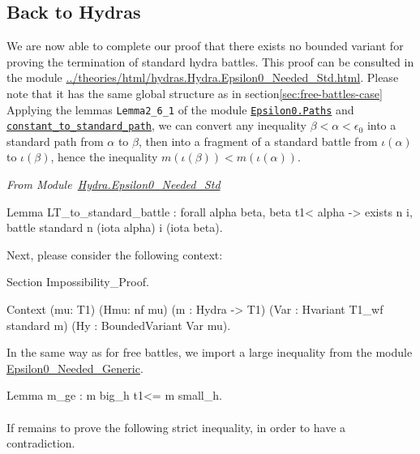 \subsection{Back to Hydras}
\label{sec:standard-battles-cases}
We are now able to complete our proof that there exists no bounded variant for proving the termination of standard hydra battles. This proof can
be consulted in the module 
\url{../theories/html/hydras.Hydra.Epsilon0_Needed_Std.html}.
Please note that it has the same global structure as in section\ref{sec:free-battles-case} 
Applying the  lemmas  \texttt{Lemma2\_6\_1} of the module 
\href{../theories/html/hydras.Epsilon0.Paths.html\#Lemma2_6_1}%
{\texttt{Epsilon0.Paths}}   and 
\href{../theories/html/hydras.Epsilon0.Paths.html\#constant_to_standard_path}%
{\texttt{constant\_to\_standard\_path}},
we can convert any inequality $\beta<\alpha<\epsilon_0$ into a standard path from
$\alpha$ to  $\beta$, then into a fragment of a standard battle from 
$\iota(\alpha)$ to $\iota(\beta)$, hence the inequality $m(\iota(\beta))<m(\iota(\alpha))$.


\vspace{4pt}
\emph{From Module~\href{../theories/html/hydras.Hydra.Epsilon0_Needed_Std.html\#LT_to_standard_battle}{Hydra.Epsilon0\_Needed\_Std}}

\begin{Coqsrc}
Lemma LT_to_standard_battle :
    forall alpha beta,
      beta t1< alpha ->
      exists n i,  battle standard  n (iota alpha) i (iota beta).
\end{Coqsrc}


Next, please consider the following context:

\begin{Coqsrc}
Section Impossibility_Proof.

Context (mu: T1)
          (Hmu: nf mu)
          (m : Hydra -> T1)
          (Var : Hvariant  T1_wf standard m)
          (Hy : BoundedVariant Var mu).
 \end{Coqsrc}

In the same way as for free battles, we import a large inequality 
from 
the module \href{../theories/html/hydras.Hydra.Epsilon0_Needed_Generic.html}{Epsilon0\_Needed\_Generic}.


\begin{Coqsrc}
 Lemma m_ge : m big_h t1<= m small_h.
\end{Coqsrc}

\paragraph*{} If remains to prove the following strict inequality, in order to have a contradiction.


